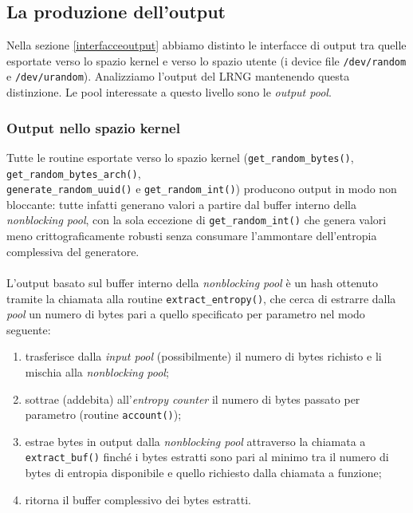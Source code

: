 \documentclass{article}
\begin{document}
 
 \subsection{La produzione dell'output}\label{produzioneoutput}
Nella sezione \ref{interfacceoutput} abbiamo distinto le interfacce di output
tra quelle esportate verso lo spazio kernel e verso lo spazio utente (i device
file \verb+/dev/random+ e \verb+/dev/urandom+). Analizziamo
l'output del LRNG mantenendo questa distinzione. Le pool interessate a questo
livello sono le \emph{output pool}.



\subsubsection{Output nello spazio kernel}\label{kerneloutput}
Tutte le routine esportate verso lo spazio kernel (\verb+get_random_bytes()+,
\verb+get_random_bytes_arch()+, \\
\verb+generate_random_uuid()+ e \verb+get_random_int()+) producono output in
modo non bloccante: tutte infatti generano valori a partire dal buffer interno
della \emph{nonblocking pool}, con la sola eccezione di \verb+get_random_int()+
che genera valori meno crittograficamente robusti senza consumare l'ammontare
dell'entropia complessiva del generatore. 

\paragraph{} L'output basato sul buffer interno della \emph{nonblocking
pool} è un hash ottenuto tramite la chiamata alla routine
\verb+extract_entropy()+, che cerca di estrarre dalla \emph{pool} un numero di
bytes pari a quello specificato per parametro nel modo seguente:
\begin{enumerate}
  \item trasferisce dalla \emph{input pool} (possibilmente) il numero di bytes
  richisto e li mischia alla \emph{nonblocking pool};
  \item sottrae (addebita) all'\emph{entropy counter} il numero di bytes passato
  per parametro (routine \verb+account()+);
  \item estrae bytes in output dalla \emph{nonblocking pool}
  attraverso la chiamata a \verb+extract_buf()+ finché i bytes estratti sono
  pari al minimo tra il numero di bytes di entropia disponibile e quello
  richiesto dalla chiamata a funzione;
  \item ritorna il buffer complessivo dei bytes estratti.
\end{enumerate}
\end{document}
